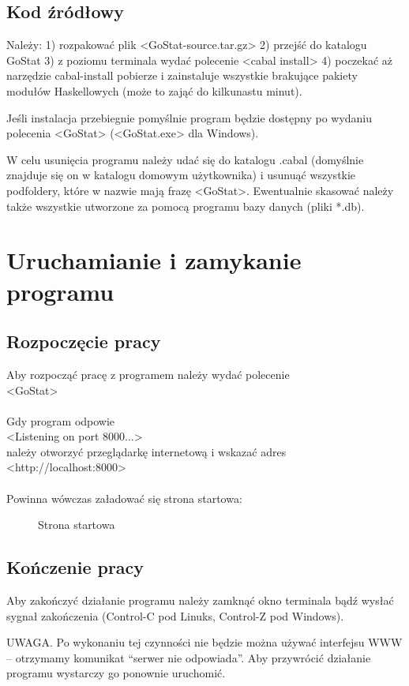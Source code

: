 \documentclass[10pt,leqno]{article}
\newcommand{\myimage}[3]{
  \begin{figure}[h!]
    \centering
      \fbox{\texttt{[image: \#2]}}
  \caption{#3}
  \end{figure}
}
\begin{document}
\subsection{Kod źródłowy}
Należy:
1) rozpakować plik <GoStat-source.tar.gz>
2) przejść do katalogu GoStat
3) z poziomu terminala wydać polecenie <cabal install>
4) poczekać aż narzędzie cabal-install pobierze i zainstaluje wszystkie brakujące pakiety modułów Haskellowych (może to zająć do kilkunastu minut).

Jeśli instalacja przebiegnie pomyślnie program będzie dostępny po wydaniu polecenia <GoStat> (<GoStat.exe> dla Windows).

W celu usunięcia programu należy udać się do katalogu .cabal (domyślnie znajduje się on w katalogu domowym użytkownika) i usunuąć wszystkie
podfoldery, które w nazwie mają frazę <GoStat>. Ewentualnie skasować należy także wszystkie utworzone za pomocą programu bazy danych (pliki *.db).

\section{Uruchamianie i zamykanie programu}

\subsection{Rozpoczęcie pracy}
Aby rozpocząć pracę z programem należy wydać polecenie \\
<GoStat> \\ 
\\
Gdy program odpowie \\
<Listening on port 8000...> \\
należy otworzyć przeglądarkę internetową i wskazać adres \\
<http://localhost:8000> \\
\\
Powinna wówczas załadować się strona startowa:

\myimage{0.4}{start.png}{Strona startowa}

\subsection{Kończenie pracy}
Aby zakończyć działanie programu należy zamknąć okno terminala bądź wysłać sygnał zakończenia (Control-C pod Linuks, Control-Z pod Windows).

UWAGA. Po wykonaniu tej czynności nie będzie można używać interfejsu WWW -- otrzymamy komunikat ``serwer nie odpowiada''. Aby przywrócić działanie programu
wystarczy go ponownie uruchomić.
\end{document}
